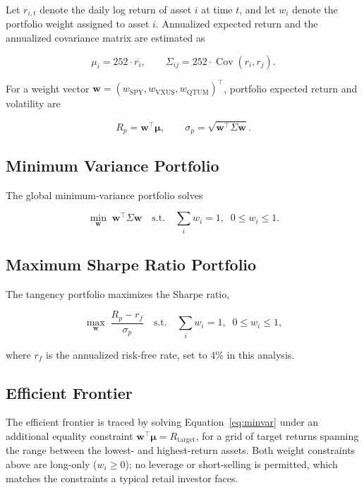 \documentclass[11pt]{article}
\begin{document}
Let $r_{i,t}$ denote the daily log return of asset $i$ at time $t$, and let
$w_i$ denote the portfolio weight assigned to asset $i$. Annualized expected
return and the annualized covariance matrix are estimated as

\begin{equation}
\mu_i = 252 \cdot \overline{r_i}, \qquad
\Sigma_{ij} = 252 \cdot \operatorname{Cov}(r_i, r_j).
\label{eq:annualize}
\end{equation}

For a weight vector $\mathbf{w} = (w_{\text{SPY}}, w_{\text{VXUS}},
w_{\text{QTUM}})^\top$, portfolio expected return and volatility are

\begin{equation}
R_p = \mathbf{w}^\top \boldsymbol{\mu}, \qquad
\sigma_p = \sqrt{\mathbf{w}^\top \Sigma \mathbf{w}}.
\label{eq:portfolio}
\end{equation}

\subsection{Minimum Variance Portfolio}

The global minimum-variance portfolio solves

\begin{equation}
\min_{\mathbf{w}} \; \mathbf{w}^\top \Sigma \mathbf{w}
\quad \text{s.t.} \quad
\sum_i w_i = 1, \;\; 0 \le w_i \le 1.
\label{eq:minvar}
\end{equation}

\subsection{Maximum Sharpe Ratio Portfolio}

The tangency portfolio maximizes the Sharpe ratio,

\begin{equation}
\max_{\mathbf{w}} \; \frac{R_p - r_f}{\sigma_p}
\quad \text{s.t.} \quad
\sum_i w_i = 1, \;\; 0 \le w_i \le 1,
\label{eq:maxsharpe}
\end{equation}

where $r_f$ is the annualized risk-free rate, set to 4\% in this analysis.

\subsection{Efficient Frontier}

The efficient frontier is traced by solving Equation~\ref{eq:minvar} under
an additional equality constraint $\mathbf{w}^\top \boldsymbol{\mu} =
R_{\text{target}}$, for a grid of target returns spanning the range between
the lowest- and highest-return assets. Both weight constraints above are
long-only ($w_i \ge 0$); no leverage or short-selling is permitted, which
matches the constraints a typical retail investor faces.
\end{document}
